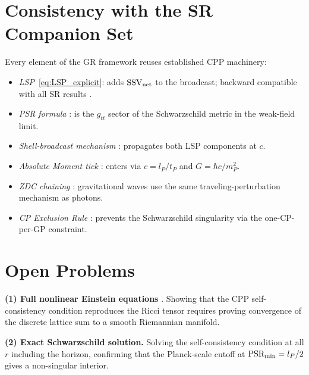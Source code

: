 \documentclass[12pt]{article}
\newcommand{\lP}{l_P}
\newcommand{\tP}{t_P}
\newcommand{\mP}{m_P}
\newcommand{\SSV}{\text{SSV}}
\newcommand{\PSR}{\text{PSR}}
\begin{document}
\section{Consistency with the SR Companion Set}
\label{sec:consistency}

Every element of the GR framework reuses established CPP machinery:

\begin{itemize}[noitemsep]
  \item \emph{LSP}~\eqref{eq:LSP_explicit}: adds
    $\mathbf{\SSV}_{\rm net}$ to the broadcast; backward compatible
    with all SR results \citep{abshier2026sr}.
  \item \emph{PSR formula} \citep[Eq.~1]{abshier2026sr}: is the
    $g_{tt}$ sector of the Schwarzschild metric in the weak-field limit.
  \item \emph{Shell-broadcast mechanism} \citep{abshier2026stiff}:
    propagates both LSP components at $c$.
  \item \emph{Absolute Moment tick} \citep{abshier2026am}: enters
    via $c = \lP/\tP$ and $G = \hbar c/\mP^2$.
  \item \emph{ZDC chaining} \citep{abshier2026zdc}: gravitational
    waves use the same traveling-perturbation mechanism as photons.
  \item \emph{CP Exclusion Rule} \citep{abshier2026am}: prevents
    the Schwarzschild singularity via the one-CP-per-GP constraint.
\end{itemize}

\section{Open Problems}
\label{sec:open}

\textbf{(1) Full nonlinear Einstein equations} \citep{einstein1915}.
Showing that the CPP self-consistency condition reproduces the Ricci
tensor requires proving convergence of the discrete lattice sum to a
smooth Riemannian manifold.

\textbf{(2) Exact Schwarzschild solution.}  Solving the
self-consistency condition at all $r$ including the horizon, confirming
that the Planck-scale cutoff at $\PSR_{\rm min} = \lP/2$ gives a
non-singular interior.
\end{document}
